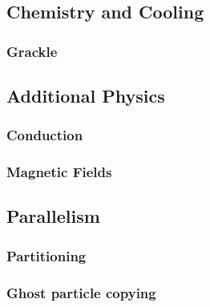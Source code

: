 \subsection{Chemistry and Cooling}
\subsubsection{Grackle}

\subsection{Additional Physics}
\subsubsection{Conduction}
\subsubsection{Magnetic Fields}

\subsection{Parallelism}
\subsubsection{Partitioning}
\subsubsection{Ghost particle copying}
